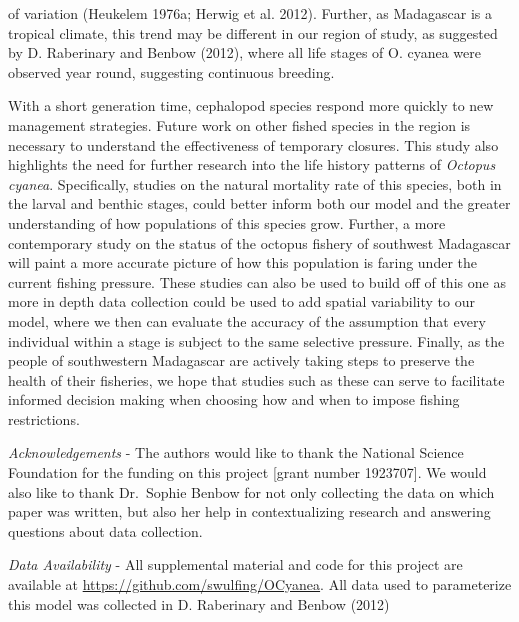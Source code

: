 \documentclass[
]{article}
\begin{document}
of variation (Heukelem 1976a; Herwig et al. 2012). Further, as Madagascar is a tropical climate, this trend may be different in our region of study, as suggested by D. Raberinary and Benbow (2012), where all life stages of O. cyanea were observed year round, suggesting continuous breeding.

With a short generation time, cephalopod species respond more quickly to new management strategies. Future work on other fished species in the region is necessary to understand the effectiveness of temporary closures. This study also highlights the need for further research into the life history patterns of \emph{Octopus cyanea}. Specifically, studies on the natural mortality rate of this species, both in the larval and benthic stages, could better inform both our model and the greater understanding of how populations of this species grow. Further, a more contemporary study on the status of the octopus fishery of southwest Madagascar will paint a more accurate picture of how this population is faring under the current fishing pressure. These studies can also be used to build off of this one as more in depth data collection could be used to add spatial variability to our model, where we then can evaluate the accuracy of the assumption that every individual within a stage is subject to the same selective pressure. Finally, as the people of southwestern Madagascar are actively taking steps to preserve the health of their fisheries, we hope that studies such as these can serve to facilitate informed decision making when choosing how and when to impose fishing restrictions.

\emph{Acknowledgements} - The authors would like to thank the National Science Foundation for the funding on this project {[}grant number 1923707{]}. We would also like to thank Dr.~Sophie Benbow for not only collecting the data on which paper was written, but also her help in contextualizing research and answering questions about data collection.

\emph{Data Availability} - All supplemental material and code for this project are available at \url{https://github.com/swulfing/OCyanea}. All data used to parameterize this model was collected in D. Raberinary and Benbow (2012)

\newpage
\end{document}

